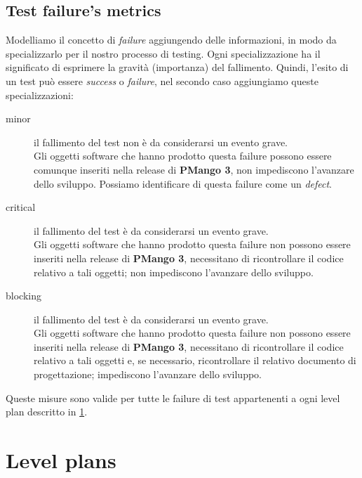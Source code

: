 \subsection{Test failure's metrics}
Modelliamo il concetto di \emph{failure} aggiungendo delle informazioni, in
modo da specializzarlo per il nostro processo di testing. Ogni
specializzazione ha il significato di esprimere la gravit\`a (importanza) del
fallimento. Quindi, l'esito di un test pu\`o essere \emph{success} o
\emph{failure}, nel secondo caso aggiungiamo queste specializzazioni:
\begin{description}
  \item[minor] il fallimento del test non \`e da considerarsi un evento grave.\\
  Gli oggetti software che hanno prodotto questa failure possono essere comunque
  inseriti nella release di \textbf{PMango 3}, non impediscono l'avanzare dello
  sviluppo. Possiamo identificare di questa failure come un \emph{defect}.
  \item[critical] il fallimento del test \`e da considerarsi un evento grave.\\
  Gli oggetti software che hanno prodotto questa failure non possono essere
  inseriti nella release di \textbf{PMango 3}, necessitano di ricontrollare il
  codice relativo a tali oggetti; non impediscono l'avanzare dello sviluppo.
  \item[blocking] il fallimento del test \`e da considerarsi un evento grave.\\
  Gli oggetti software che hanno prodotto questa failure non possono essere
  inseriti nella release di \textbf{PMango 3}, necessitano di ricontrollare il
  codice relativo a tali oggetti e, se necessario, ricontrollare il relativo
  documento di progettazione; impediscono l'avanzare dello sviluppo.
\end{description}
Queste misure sono valide per tutte le failure di test appartenenti a ogni
level plan descritto in \ref{sec:levelPlans}.


\section{Level plans}
\label{sec:levelPlans}

